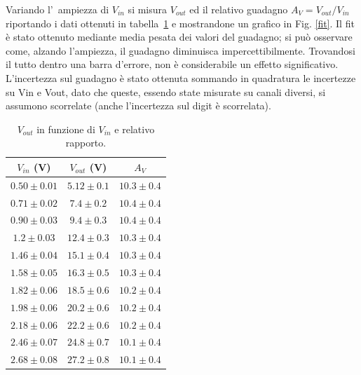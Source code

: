 \documentclass[10pt,a4paper]{article}
\begin{document}
	Variando l'~ampiezza di $V_{in}$ si misura $V_{out}$ ed il relativo guadagno $A_V=V_{out}/V_{in}$ riportando i dati ottenuti in tabella~\ref{tab:guadagno} 
	e mostrandone un grafico in Fig. \ref{fit}. 
	Il fit è stato ottenuto mediante media pesata dei valori del guadagno; si può osservare come, alzando l'ampiezza, il guadagno diminuisca impercettibilmente. Trovandosi il tutto dentro una barra d'errore, non è considerabile un effetto significativo.
	L'incertezza sul guadagno è stato ottenuta sommando in quadratura le incertezze su Vin e Vout, dato che queste, essendo state misurate su canali diversi, si assumono scorrelate (anche l'incertezza sul digit è scorrelata).
	
	\begin{table}[h]
		\caption{$V_{out}$ in funzione di $V_{in}$ e relativo rapporto.}
		\label{tab:guadagno}
		\begin{center}
			\begin{tabular}{|c|c|c|}
				\hline
				$V_{in}$ (V) & $V_{out}$ (V)  & $A_V$ \\
				\hline
				\hline
				$ 0.50\pm 0.01 $ & $5.12 \pm 0.1 $ & $10.3 \pm 0.4 $ \\
				\hline
				$0.71 \pm 0.02 $ & $7.4 \pm 0.2 $ & $10.4 \pm 0.4 $ \\
				\hline
				$0.90 \pm 0.03 $ & $9.4 \pm 0.3 $ & $10.4 \pm 0.4 $ \\
				\hline
				$1.2 \pm 0.03 $ & $12.4 \pm 0.3 $ & $10.3 \pm 0.4 $ \\
				\hline
				$1.46 \pm 0.04 $ & $15.1 \pm 0.4 $ & $10.3 \pm 0.4 $ \\
				\hline
				$1.58 \pm 0.05 $ & $16.3 \pm 0.5 $ & $10.3 \pm 0.4 $ \\
				\hline
				$1.82 \pm 0.06 $ & $18.5 \pm 0.6 $ & $10.2 \pm 0.4 $ \\
				\hline
				$1.98 \pm 0.06 $ & $20.2 \pm 0.6 $ & $10.2 \pm 0.4 $ \\
				\hline
				$2.18 \pm 0.06 $ & $22.2 \pm 0.6 $ & $10.2 \pm 0.4 $ \\
				\hline
				$2.46 \pm 0.07 $ & $24.8 \pm 0.7 $ & $10.1 \pm 0.4 $ \\
				\hline
				$2.68 \pm 0.08 $ & $27.2 \pm 0.8 $ & $10.1 \pm 0.4 $ \\
				\hline
			\end{tabular}
		\end{center}
	\end{table}
\end{document}
